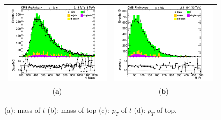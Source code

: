 \documentclass{cmspaper}
\begin{document}
\begin{figure}[!htp]
\centering
\begin{tabular}{cc}
\hspace{-0.5cm}
\includegraphics[scale=0.40]{results/Mass_H.png}
& \hspace{-0.5cm} \includegraphics[scale=0.40]{results/Pt_H.png}\\
   ($\mathbf{a}$)\qquad\qquad&($\mathbf{b}$)\qquad\qquad\qquad\\
\end{tabular}
\caption{(a): mass of $\overline{t}$ (b): mass of top (c): $p_{T}$ of $\overline{t}$ (d): $p_{T}$ of top.}\label{W_boson}
\end{figure}
\end{document}
